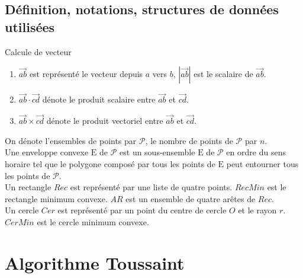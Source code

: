\documentclass[14px]{article}
\begin{document}
\subsection{Définition, notations, structures de données utilisées}
Calcule de vecteur
\begin{enumerate}
	\item $\overrightarrow{ab}$ est représenté le vecteur depuis $a$ vers $b$, $|\overrightarrow{ab}|$ est le scalaire de $\overrightarrow{ab}$.
	\item $\overrightarrow{ab}\cdot\overrightarrow{cd}$ dénote le produit scalaire entre $\vec{ab}$ et $\vec{cd}$.
	\item $\overrightarrow{ab}\times\overrightarrow{cd}$ dénote le produit vectoriel entre $\overrightarrow{ab}$ et $\overrightarrow{cd}$.
\end{enumerate}

On dénote l'ensembles de points par $\mathcal{P}$, le nombre de points de $\mathcal{P}$ par $n$.\\
Une enveloppe convexe $\mathrm{E}$ de $\mathcal{P}$ est un sous-ensemble $\mathrm{E}$ de $\mathcal{P}$ en ordre du sens horaire tel que le polygone composé par tous les points de $\mathrm{E}$ peut entourner tous les points de $\mathcal{P}$.\\
Un rectangle $Rec$ est représenté par une liste de quatre points. $RecMin$ est le rectangle minimum convexe. $AR$ est un ensemble de quatre arêtes de $Rec$.\\
Un cercle $Cer$ est représenté par un point du centre de cercle $O$ et le rayon $r$. $CerMin$ est le cercle minimum convexe.
\clearpage

\section{Algorithme Toussaint}
\end{document}
